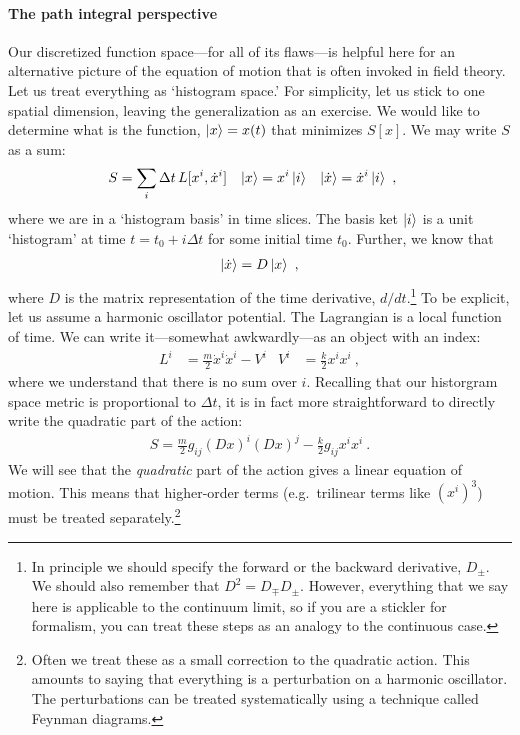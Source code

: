\documentclass[12pt, oneside]{report}    %
\begin{document}
\paragraph{The path integral perspective} Our discretized function space---for all of its flaws---is helpful here for an alternative picture of the equation of motion that is often invoked in field theory. Let us treat everything as `histogram space.' For simplicity, let us stick to one spatial dimension, leaving the generalization as an exercise. We would like to determine what is the function, $\left|x\right\rangle=x(t)$ that minimizes $S[x]$. We may write $S$ as a sum:
\begin{align}
    S &= \sum_i \Delta t \, L[x^i, \dot x^i] 
    &
    \left|x\right\rangle &= x^i \left|i\right\rangle
    &
    \left|\dot{x}\right\rangle &= \dot{x}^i \left|i\right\rangle \ ,
\end{align}
where we are in a `histogram basis' in time slices. The basis ket $\left|i\right\rangle$ is a unit `histogram' at time $t=t_0 + i\Delta t$ for some initial time $t_0$. Further, we know that 
\begin{align}
    \left|\dot{x}\right\rangle = D\left|x\right\rangle \ ,
\end{align}
where $D$ is the matrix representation of the time derivative, $d/dt$.\footnote{In principle we should specify the forward or the backward derivative, $D_\pm$. We should also remember that $D^2 = D_\mp D_\pm$. However, everything that we say here is applicable to the continuum limit, so if you are a stickler for formalism, you can treat these steps as an analogy to the continuous case.} To be explicit, let us assume a harmonic oscillator potential. The Lagrangian is a local function of time. We can write it---somewhat awkwardly---as an object with an index:
\begin{align}
    L^i &= \frac{m}{2}\dot{x}^i\dot{x}^i - V^i
    &
    V^i &= \frac{k}{2} x^ix^i \ ,
\end{align}
where we understand that there is no sum over $i$. Recalling that our historgram space metric is proportional to $\Delta t$, it is in fact more straightforward to directly write the quadratic part of the action:
\begin{align}
    S 
    =
    \frac{m}{2} g_{ij}(Dx)^i(Dx)^j - \frac{k}{2} g_{ij} x^ix^i
     \ .
    \label{eq:HO:action:discretized}
\end{align}
We will see that the \emph{quadratic} part of the action gives a linear equation of motion. This means that higher-order terms (e.g.\ trilinear terms like $(x^i)^3$) must be treated separately.\footnote{Often we treat these as a small correction to the quadratic action. This amounts to saying that everything is a perturbation on a harmonic oscillator. The perturbations can be treated systematically using a technique called Feynman diagrams.}
\end{document}
